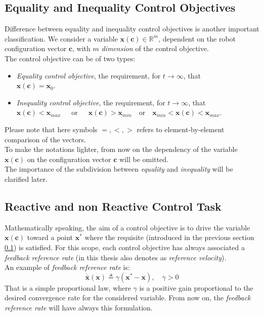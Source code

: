 \subsection{Equality and Inequality Control Objectives}
\label{sec:eqIneqObj}
Difference between equality and inequality control objectives is another important classification. We consider a variable  $ \boldsymbol{x}(\boldsymbol{c}) \in \mathbb{R}^m $, dependent on the robot configuration vector $ \boldsymbol{c}$, with $ m $ \textit{dimension} of the control objective. \\
The control objective can be of two types:
\begin{itemize}
	\item \textit{Equality control objective}, the requirement, for $t \to \infty$, that \\ \mbox{$\boldsymbol{x}(\boldsymbol{c}) = \boldsymbol{x}_0$}.
	
	\item \textit{Inequality control objective}, the requirement, for $t \to \infty$, that \\ \mbox{$\boldsymbol{x}(\boldsymbol{c}) < \boldsymbol{x}_{max}$ ~ or ~ $\boldsymbol{x}(\boldsymbol{c}) > \boldsymbol{x}_{min}$ ~or ~$ \boldsymbol{x}_{min} < \boldsymbol{x}(\boldsymbol{c}) < \boldsymbol{x}_{max}$}.
\end{itemize}
Please note that here symbols $= , < , >$ refers to element-by-element comparison of the vectors.\\
To make the notations lighter, from now on the dependency of the variable $\boldsymbol{x}(\boldsymbol{c})$ on the configuration vector $\boldsymbol{c}$ will be omitted.\\
The importance of the subdivision between \textit{equality} and \textit{inequality} will be clarified later.

\subsection{Reactive and non Reactive Control Task}
\label{sec:reactNonReact}
Mathematically speaking, the aim of a control objective is to drive the variable $\boldsymbol{x}(\boldsymbol{c})$ toward a point $ \boldsymbol{x}^* $ where the requisite (introduced in the previous section \ref{sec:eqIneqObj}) is satisfied.
For this scope, each control objective has always associated a \textit{feedback reference rate} (in this thesis also denotes as \textit{reference velocity}).\\
An example of \textit{feedback reference rate} is:
\begin{equation}
	\label{feedbackRate}
	\boldsymbol{\dot{{\bar{x}}}} (\boldsymbol{x}) \triangleq \gamma (\boldsymbol{x}^* - \boldsymbol{x}),\quad \gamma > 0
\end{equation}
That is a simple proportional law, where $\gamma$ is a positive gain proportional to the desired convergence rate for the considered variable. From now on, the \textit{feedback reference rate} will have always this formulation.\\

